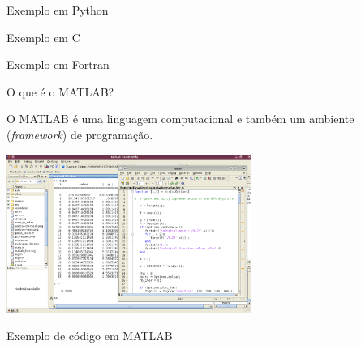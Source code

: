 \documentclass[hyperref={pdfpagelabels=false}]{beamer}
\begin{document}
\begin{frame}{Exemplo em Python}
  \begin{center}
    \begin{minipage}{0.7\textwidth}
      
    \end{minipage}
  \end{center}
\end{frame}

\begin{frame}{Exemplo em C}
  \begin{center}
    \begin{minipage}{0.7\textwidth}
      
    \end{minipage}
	\end{center}
\end{frame}

\begin{frame}{Exemplo em Fortran}
  \begin{center}
    \begin{minipage}{0.7\textwidth}
      
    \end{minipage}
	\end{center}
\end{frame}

\begin{frame}{O que é o MATLAB?}
  \begin{center}
		O MATLAB é uma linguagem computacional e também um ambiente (\emph{framework}) de programação.
		
		\includegraphics[width=8cm]{img/matlab.png}
  \end{center}
\end{frame}

\begin{frame}{Exemplo de código em MATLAB}
  \begin{center}
    \begin{minipage}{0.7\textwidth}
      
    \end{minipage}
	\end{center}
\end{frame}
\end{document}
